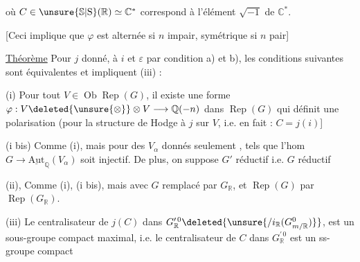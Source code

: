 où $C\in\unsure{\mathbb{S}|\mathrm{S}}(\mathbb{R})\simeq\mathbb{C}^{*}$ correspond à l'élément $\sqrt{-1}$ de $\mathbb{C}^{*}$.

[Ceci implique que $\varphi$ est alternée si $n$ impair, symétrique si $n$ pair]

\uline{Théorème} Pour $j$ donné,  à $i$ et $\varepsilon$ par condition a) et b), les conditions suivantes  sont équivalentes et impliquent (iii) :

(i) Pour tout $V\in\operatorname{Ob}\operatorname{Rep}(G)$,  il existe une forme $\varphi:V\deleted{\unsure{\otimes}}\otimes V\longrightarrow\mathbb{Q}(-n)$ dans $\operatorname{Rep}(G)$ qui définit une polarisation (pour la structure de Hodge  à $j$ sur $V$, \unsure{$j$|$]$|$\}$} i.e. en fait : $C=j(i)$]

(i bis) Comme (i), mais  pour des $V_{\alpha}$ donnés seulement ,  tels que  l'hom $G\longrightarrow\underline{\mathrm{Aut}}_{\mathbb{Q}}(V_{\alpha})$ soit injectif. De plus, on suppose $G'$ réductif i.e. $G$ réductif

(ii),  Comme (i), (i bis), mais avec $G$ remplacé par $G_{\mathbb{R}}$, et $\operatorname{Rep}(G)$ par $\operatorname{Rep}(G_{\mathbb{R}})$.

(iii)  Le centralisateur de $j(C)$  dans $G_{\mathbb{R}}^{\prime\,0}\deleted{\unsure{/i_{\mathbb{R}}(G_{m/\mathbb{R}}^{0})}}$,  est un sous-groupe compact maximal,  i.e. le centralisateur de $C$ dans $G_{\mathbb{R}}^{\prime\,0}$ est un ss-groupe compact 

